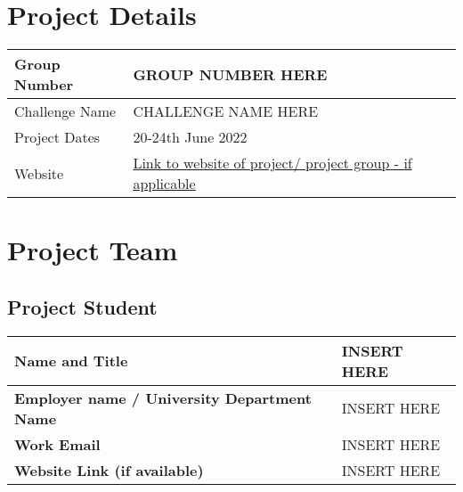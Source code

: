 \documentclass[11pt, titlepage]{article}
\newcommand{\groupnumber}{GROUP NUMBER HERE\xspace}  %
\newcommand{\challengename}{CHALLENGE NAME HERE\xspace} %
\begin{document}
\AISDTitlePage{}
\publishinginfo{}
\AISDContents{}

\setcounter{page}{1}
\section{Project Details}

\begin{table}[H]
\centering
\begin{tabular}{|p{1.5in}|p{4.5in}|}
\hline
Group Number & {\groupnumber} \\
\hline
Challenge Name & {\challengename} \\ %
\hline
Project Dates & 20-24th June 2022
 \\ %
\hline
Website & 
\href{xxx}{Link to website of project/ project group - if applicable} \\ %
\hline
\end{tabular}
 \end{table}


\section{Project Team}
\subsection{Project Student}
\begin{table}[H]
	\centering
	\begin{tabular}{|p{2in}|p{4in}|}
		\hline
		\textbf{Name and Title} & INSERT HERE \\ %
		\hline
		\textbf{Employer name / University Department Name} & 
		INSERT HERE \\ %
		\hline
		\textbf{Work Email} & 
		INSERT HERE \\ %
		\hline
		\textbf{Website Link (if available)} & 
		INSERT HERE \\ %
		\hline		
	\end{tabular}
\end{table}
\end{document}
